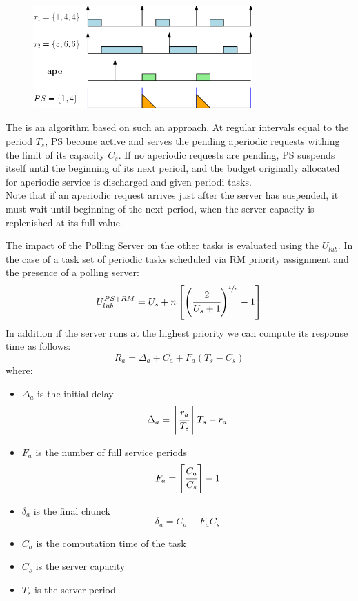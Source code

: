 \begin{figure}[!h]
    \centering
    \includegraphics[width = 0.75\textwidth]{images/image04.png}
\end{figure}


The  is an algorithm based on such an approach. At regular intervals equal to the period $T_s$, PS become active and serves the pending aperiodic requests withing the limit of its capacity $C_s$. If no aperiodic requests are pending, PS suspends itself until the beginning of its next period, and the budget originally allocated for aperiodic service is discharged and given periodi tasks.\\
Note that if an aperiodic request arrives just after the server has suspended, it must wait until beginning of the next period, when the server capacity is replenished at its full value.

The impact of the Polling Server on the other tasks is evaluated using the $U_{lub}$. In the case of a task set of periodic tasks scheduled via RM priority assignment and the presence of a polling server:
\[U_{lub}^{PS + RM} = U_s + n\left[\left(\cfrac{2}{U_s+1}\right)^{\sfrac{1}{n}} -1\right]\]
In addition if the server runs at the highest priority we can compute its response time as follows:
\[R_a = \Delta_a + C_a + F_a (T_s - C_s)\]
where:
\begin{itemize}
    \item $\Delta_a$ is the initial delay
    \[\Delta_a = \left\lceil \cfrac{r_a}{T_s} \right\rceil T_s - r_a\]
    \item $F_a$ is the number of full service periods
    \[F_a = \left\lceil \cfrac{C_a}{C_s} \right\rceil-1\]
    \item $\delta_a$ is the final chunck
    \[\delta_a = C_a - F_aC_s\]
    \item $C_a$ is the computation time of the task
    \item $C_s$ is the server capacity
    \item $T_s$ is the server period
\end{itemize}
